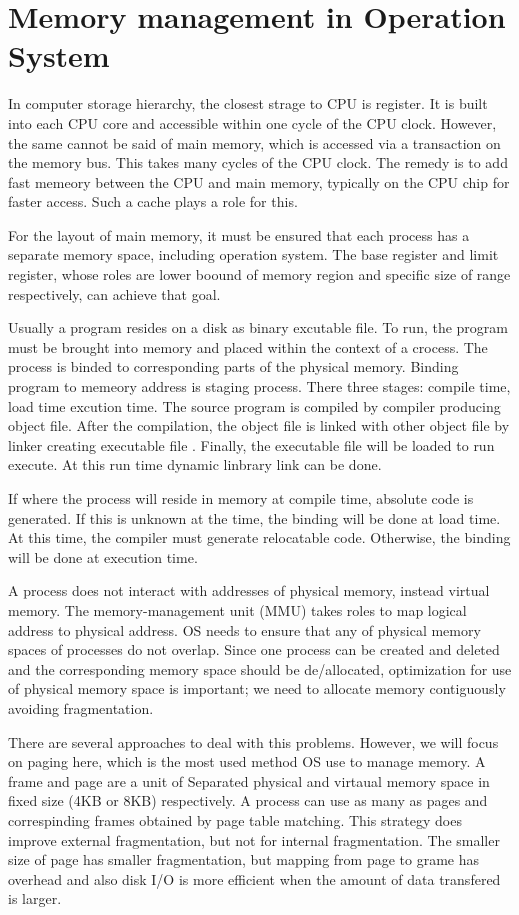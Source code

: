 \section{Memory management in Operation System}
\label{sec:history}
In computer storage hierarchy, the closest strage to CPU is register. It is built into each CPU core and accessible within one cycle of the CPU clock.
However, the same cannot be said of main memory, which is accessed via a transaction on the memory bus. This takes many cycles of the CPU clock.
The remedy is to add fast memeory between the CPU and main memory, typically on the CPU chip for faster access. Such a cache plays a role for this.

For the layout of main memory, it must be ensured that each process has a separate memory space, including operation system. 
The base register and limit register, whose roles are lower boound of memory region and specific size of range respectively, can achieve that goal. 

Usually a program resides on a disk as binary excutable file. To run, the program must be brought into memory and placed within the context of a crocess.
The process is binded to corresponding parts of the physical memory. Binding program to memeory address is staging process. 
There three stages: compile time, load time excution time. The source program is compiled by compiler producing object file. 
After the compilation, the object file is linked with other object file by linker creating executable file . 
Finally, the executable file will be loaded to run execute. At this run time dynamic linbrary link can be done.

If where the process will reside in memory at compile time, absolute code is generated. If this is unknown at the time, 
the binding will be done at load time. At this time, the compiler must generate relocatable code. Otherwise, the binding will be done at 
execution time.

A process does not interact with addresses of physical memory, instead virtual memory. The memory-management unit (MMU) takes roles to map 
logical address to physical address. OS needs to ensure that any of physical memory spaces of processes do not overlap. 
Since one process can be created and deleted and the corresponding memory space should be de/allocated, 
optimization for use of physical memory space is important; we need to allocate memory contiguously avoiding fragmentation.

There are several approaches to deal with this problems. However, we will focus on paging here, which is the most used method OS use to manage memory.
A frame and page are a unit of Separated physical and virtaual memory space in fixed size (4KB or 8KB) respectively.
A process can use as many as pages and correspinding frames obtained by page table matching. This strategy does improve external fragmentation, but not for internal fragmentation.
The smaller size of page has smaller fragmentation, but mapping from page to grame has overhead and also disk I/O is more efficient when the amount of data transfered is larger.



